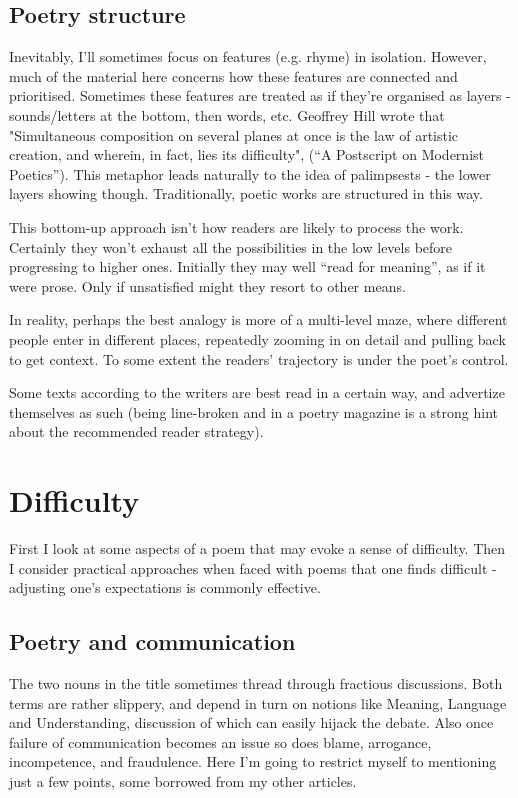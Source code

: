 \documentclass[11pt]{article}
\begin{document}
\subsection*{Poetry structure}

Inevitably, I'll sometimes focus on features (e.g. rhyme) in isolation. However, much of the material here concerns how these features are connected and prioritised. Sometimes these features are treated as if they're organised as layers - sounds/letters at the bottom, then words, etc.  Geoffrey Hill wrote that "Simultaneous composition on several planes at once is the law of artistic creation, and wherein, in fact, lies its difficulty", (``A Postscript on Modernist Poetics''). This metaphor leads naturally to the idea of palimpsests - the lower layers showing though. Traditionally, poetic works are structured in this way.

This bottom-up approach isn't how readers are likely to process the work. Certainly they won't exhaust all the possibilities in the low levels before progressing to higher ones. Initially they may well ``read for meaning'', as if it were prose. Only if unsatisfied might they resort to other means. 

In reality, perhaps the best analogy is more of a multi-level maze, where different people enter in different places, repeatedly zooming in on detail and pulling back to get context. To some extent the readers' trajectory is under the poet's control. 

Some texts according to the writers are best read in a certain way, and advertize themselves as such (being line-broken and in a poetry magazine is a strong hint about the recommended reader strategy).

\newpage
\section{Difficulty}
First I look at some aspects of a poem that may evoke a sense of difficulty. Then I consider practical approaches when faced with poems that one finds difficult - adjusting one's expectations is commonly effective.

\subsection{Poetry and communication}

The two nouns in the title sometimes thread through fractious discussions. Both
terms are rather slippery, and depend in turn on notions like Meaning,
Language and Understanding, discussion of which can easily hijack the
debate. Also once failure of communication becomes an issue so does blame,
arrogance, incompetence, and fraudulence. Here I'm going to restrict myself
to mentioning just a few points, some borrowed from my other articles.
\end{document}
